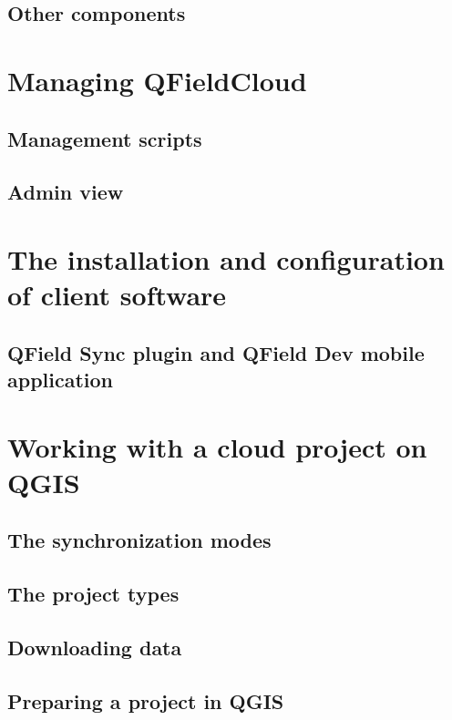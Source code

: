 \documentclass{article}
\begin{document}
\subsection{Other components}

\section{Managing QFieldCloud}

\subsection{Management scripts}

\subsection{Admin view}

\section{The installation and configuration of client software}

\subsection{QField Sync plugin and QField Dev mobile application}

\section{Working with a cloud project on QGIS}

\subsection{The synchronization modes}

\subsection{The project types}

\subsection{Downloading data}

\subsection{Preparing a project in QGIS}
\end{document}
